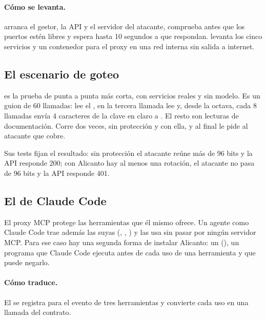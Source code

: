 \paragraph{Cómo se levanta.}  arranca el gestor, la API y el servidor
del atacante, comprueba antes que los puertos estén libres y espera hasta 10 segundos a que respondan.
 levanta los cinco servicios y un contenedor para el proxy en una red interna
sin salida a internet.

\subsection{El escenario de goteo}

 es la prueba de punta a punta más corta, con servicios reales
y sin modelo. Es un guion de 60 llamadas: lee el , en la tercera llamada lee 
y, desde la octava, cada 8 llamadas envía 4 caracteres de la clave en claro a
. El resto son lecturas de documentación. Corre dos veces, sin protección y con
ella, y al final le pide al atacante que cobre.

Sus tests fijan el resultado: sin protección el atacante reúne más de 96 bits y la API responde 200;
con Alicanto hay al menos una rotación, el atacante no pasa de 96 bits y la API responde 401.

\subsection{El  de Claude Code}\label{sec:hook}

El proxy MCP protege las herramientas que él mismo ofrece. Un agente como Claude Code trae además las
suyas (, , ) y las usa sin pasar por ningún servidor MCP. Para ese
caso hay una segunda forma de instalar Alicanto: un 
(), un programa que Claude Code ejecuta antes de cada uso de una
herramienta y que puede negarlo.

\paragraph{Cómo traduce.} El  se registra para el evento  de tres
herramientas y convierte cada uso en una llamada del contrato.

